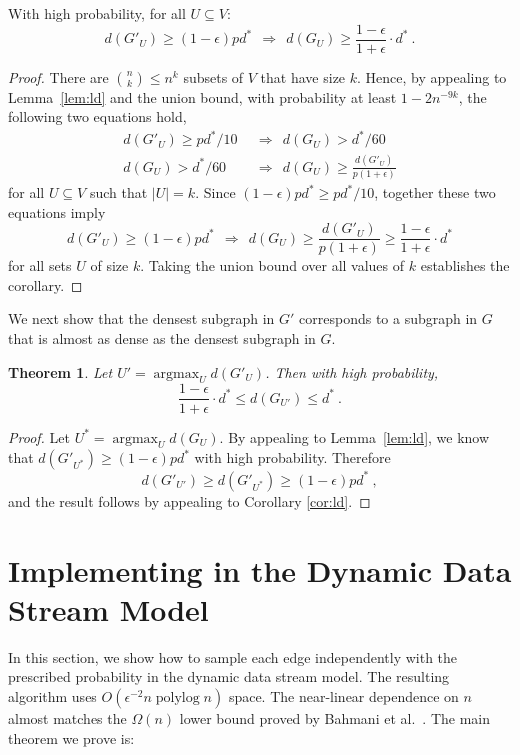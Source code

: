 \documentclass[11pt]{article}
\newtheorem{theorem}{Theorem}\newtheorem{definition}[theorem]{Definition}
\DeclareMathOperator{\polylog}{polylog}
\DeclareMathOperator{\argmax}{{argmax}}
\begin{document}
\begin{corollary}
\label{cor:ld}
With high probability, for all $U\subseteq V$:
\[d(G'_U)\geq (1-\epsilon) pd^* ~~ \Rightarrow~~ d(G_U)\geq \frac{1-\epsilon}{1+\epsilon} \cdot d^* \ .\]
\end{corollary}
\begin{proof}
There are ${n \choose k}\leq n^k$ subsets of $V$ that have size $k$. Hence, by appealing to Lemma~\ref{lem:ld} and the union bound, with probability at least $1-2n^{-9k}$, the following two equations hold,
\begin{align*}
d(G'_U) \geq  pd^*/10 
 & ~~\Rightarrow~~ d(G_U)>  d^*/60 
\\
d(G_U)>  d^*/60 
 & ~~\Rightarrow~~  d(G_U)\geq \frac{d(G'_U)}{p(1+\epsilon)} 
\end{align*}
for all $U\subseteq V$ such that $|U|=k$. Since  $(1-\epsilon) pd^*\geq pd^*/10$, together these two equations imply 
\[
d(G'_U)\geq (1-\epsilon) pd^* ~~ \Rightarrow~~ d(G_U)\geq \frac{d(G'_U)}{p(1+\epsilon)} \geq \frac{1-\epsilon}{1+\epsilon} \cdot d^*
\]
for all sets $U$ of size $k$. Taking the union bound over all values of $k$ establishes the corollary.\end{proof}

We next show that the densest subgraph in $G'$ corresponds to a subgraph in $G$ that is almost as dense as the densest subgraph in $G$.

\begin{theorem}
Let $U'=\argmax_U d(G'_U)$. Then with high probability, 
\[
 \frac{1 - \epsilon}{1+\epsilon} \cdot d^* 
\leq d(G_{U'}) \leq d^* \ .
\]
\end{theorem}
\begin{proof}
Let $U^*= \argmax_U d(G_U)$. By appealing to Lemma~\ref{lem:ld}, we know that $d(G'_{U^*})\geq (1 - \epsilon) p d^*$ with high probability. Therefore 
\begin{equation*}
d(G'_{U'}) \geq d(G'_{U^*}) \geq (1 - \epsilon) p d^* \ ,
\end{equation*}
and the result follows by appealing to Corollary \ref{cor:ld}.
\end{proof}

\section{Implementing in the Dynamic Data Stream Model}\label{sec:streamalg}

In this section, we show how to sample each edge independently with the prescribed probability in the dynamic data stream model. The resulting algorithm  uses $O(\epsilon^{-2} n\polylog n)$ space. The near-linear dependence on $n$ almost matches the $\Omega(n)$ lower bound proved by Bahmani  et al.~\cite{BahmaniKV12}. The main theorem we prove is:
\end{document}
